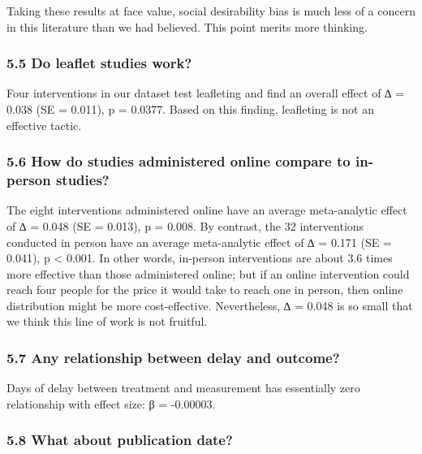 \documentclass[
  letterpaper,
  DIV=11,
  numbers=noendperiod]{scrartcl}
\begin{document}
Taking these results at face value, social desirability bias is much
less of a concern in this literature than we had believed. This point
merits more thinking.

\hypertarget{do-leaflet-studies-work}{%
\subsubsection{5.5 Do leaflet studies
work?}\label{do-leaflet-studies-work}}

Four interventions in our dataset test leafleting and find an overall
effect of ∆ = 0.038 (SE = 0.011), p = 0.0377. Based on this finding,
leafleting is not an effective tactic.

\hypertarget{how-do-studies-administered-online-compare-to-in-person-studies}{%
\subsubsection{5.6 How do studies administered online compare to
in-person
studies?}\label{how-do-studies-administered-online-compare-to-in-person-studies}}

The eight interventions administered online have an average
meta-analytic effect of ∆ = 0.048 (SE = 0.013), p = 0.008. By contrast,
the 32 interventions conducted in person have an average meta-analytic
effect of ∆ = 0.171 (SE = 0.041), p \textless{} 0.001. In other words,
in-person interventions are about 3.6 times more effective than those
administered online; but if an online intervention could reach four
people for the price it would take to reach one in person, then online
distribution might be more cost-effective. Nevertheless, ∆ = 0.048 is so
small that we think this line of work is not fruitful.

\hypertarget{any-relationship-between-delay-and-outcome}{%
\subsubsection{5.7 Any relationship between delay and
outcome?}\label{any-relationship-between-delay-and-outcome}}

Days of delay between treatment and measurement has essentially zero
relationship with effect size: β = -0.00003.

\hypertarget{what-about-publication-date}{%
\subsubsection{5.8 What about publication
date?}\label{what-about-publication-date}}
\end{document}
